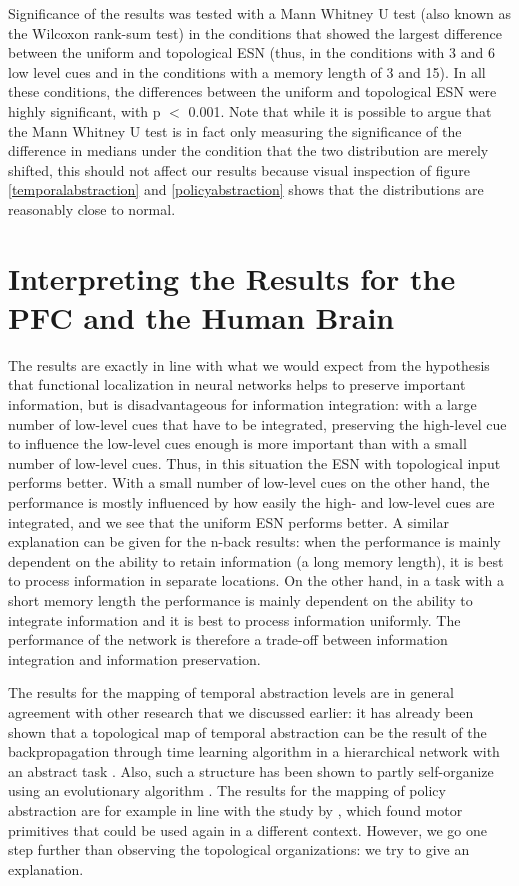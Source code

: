 \documentclass[10pt,a4paper]{report}
\begin{document}
Significance of the results was tested with a Mann Whitney U test (also known as the Wilcoxon rank-sum test) in the conditions that showed the largest difference between the uniform and topological ESN (thus, in the conditions with 3 and 6 low level cues and in the conditions with a memory length of 3 and 15). In all these conditions, the differences between the uniform and topological ESN were highly significant, with p $<$ 0.001. Note that while it is possible to argue that the Mann Whitney U test is in fact only measuring the significance of the difference in medians under the condition that the two distribution are merely shifted, this should not affect our results because visual inspection of figure \ref{temporalabstraction} and \ref{policyabstraction} shows that the distributions are reasonably close to normal.

\section{Interpreting the Results for the PFC and the Human Brain}

The results are exactly in line with what we would expect from the hypothesis that functional localization in neural networks helps to preserve important information, but is disadvantageous for information integration: with a large number of low-level cues that have to be integrated, preserving the high-level cue to influence the low-level cues enough is more important than with a small number of low-level cues. Thus, in this situation the ESN with topological input performs better. With a small number of low-level cues on the other hand, the performance is mostly influenced by how easily the high- and low-level cues are integrated, and we see that the uniform ESN performs better. A similar explanation can be given for the n-back results: when the performance is mainly dependent on the ability to retain information (a long memory length), it is best to process information in separate locations. On the other hand, in a task with a short memory length the performance is mainly dependent on the ability to integrate information and it is best to process information uniformly. The performance of the network is therefore a trade-off between information integration and information preservation. 

The results for the mapping of temporal abstraction levels are in general agreement with other research that we discussed earlier: it has already been shown that a topological map of temporal abstraction can be the result of the backpropagation through time learning algorithm in a hierarchical network with an abstract task \citep{Botvinick2007}. Also, such a structure has been shown to partly self-organize using an evolutionary algorithm \citep{Paine2005}. The results for the mapping of policy abstraction are for example in line with the study by \citet{Yamashita2008}, which found motor primitives that could be used again in a different context. However, we go one step further than observing the topological organizations: we try to give an explanation.
\end{document}
